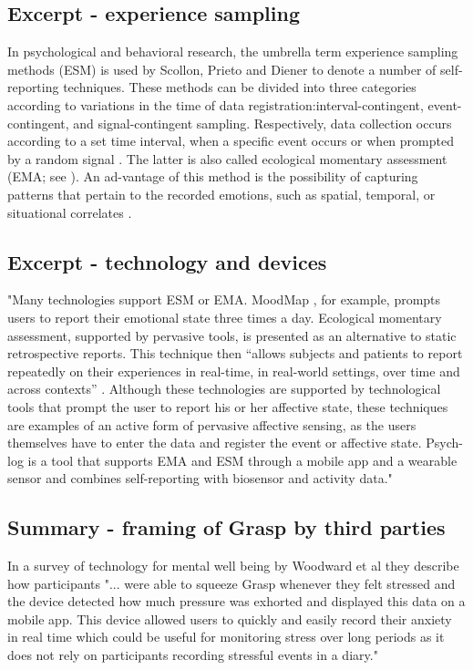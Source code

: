 \subsection{Excerpt - experience sampling }
In psychological and behavioral research, the umbrella term experience sampling methods (ESM) is used by Scollon, Prieto  and  Diener  \cite{scollon2003}  to  denote  a  number  of  self-reporting techniques.   These methods can be divided into three categories according to variations in the time of data registration:interval-contingent,  event-contingent,  and  signal-contingent sampling.  Respectively, data collection occurs according to a  set  time  interval,  when  a  specific  event  occurs  or  when prompted by a random signal \cite{scollon2003}.  The latter is also called ecological momentary assessment (EMA; see \cite{shiffman2008}).  An ad-vantage of this method is the possibility of capturing patterns that pertain to the recorded emotions, such as spatial, temporal, or situational correlates \cite{scollon2003}. \cite[p.~2]{guribye2016}

\subsection{Excerpt - technology and devices }
"Many technologies support ESM or EMA. MoodMap \cite{morris2010}, for example, prompts users to report their emotional state three times a day. Ecological momentary assessment, supported by pervasive tools, is presented as an alternative to static retrospective reports. This technique then “allows subjects and patients to report repeatedly on their experiences in real-time, in real-world settings, over time and across contexts”  \cite[p. 3]{shiffman2008}. Although these technologies are supported by technological tools that prompt the user to report his or her affective state, these techniques are examples of an active form of pervasive affective sensing, as the users themselves have to enter the data and register the event or affective state. Psych-log \cite{gaggioli2013} is a tool that supports EMA and ESM through a mobile app and a wearable sensor and combines self-reporting with biosensor and activity data."
\cite[p.~2]{guribye2016}

\subsection{Summary - framing of Grasp by third parties}
In a survey of technology for mental well being by Woodward et al \cite[p.~6]{DBLP:journals/corr/abs-1905-00288} they describe how participants "... were able to squeeze Grasp whenever they felt stressed and the device detected how much pressure was exhorted and displayed this data on a mobile app. This device allowed users to quickly and easily record their anxiety in real time which could be useful for monitoring stress over long periods as it does not rely on participants recording stressful events in a diary."

